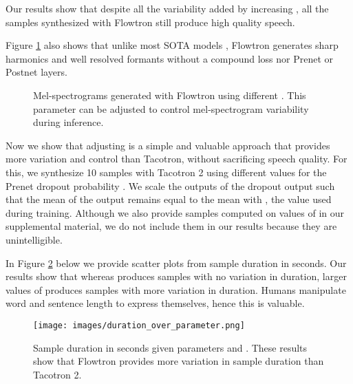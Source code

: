 \documentclass{article}
\begin{document}
Our results show that despite all the variability added by increasing , all the samples synthesized with Flowtron still produce high quality speech.

Figure \ref{fig:mel_quality} also shows that unlike most SOTA models \cite{shen2017natural,arik2017deep,arik2017deep2,ping2017deep,skerry2018towards, wang2018style,binkowski2019high}, Flowtron generates sharp harmonics and well resolved formants without a compound loss nor Prenet or Postnet layers.

\begin{figure}[!ht]
    \centering
    
    
    \caption{Mel-spectrograms generated with Flowtron using different . This parameter can be adjusted to control mel-spectrogram variability during inference.}
    \label{fig:mel_quality}
\end{figure}

Now we show that adjusting  is a simple and valuable approach that provides more variation and control than Tacotron, without sacrificing speech quality. For this, we synthesize 10 samples with Tacotron 2 using different values for the Prenet dropout probability . We scale the outputs of the dropout output such that the mean of the output remains equal to the mean with , the value used during training. Although we also provide samples computed on values of  in our supplemental material, we do not include them in our results because they are unintelligible.

In Figure \ref{fig:sentence_durations} below we provide scatter plots from sample duration in seconds. Our results show that whereas   produces samples with no variation in duration, larger values of  produces samples with more variation in duration. Humans manipulate word and sentence length to express themselves, hence this is valuable.

\begin{figure}[!ht]
    \centering
    \texttt{[image: images/duration\_over\_parameter.png]}
    \caption{Sample duration in seconds given parameters  and . These results show that Flowtron provides more variation in sample duration than Tacotron 2.}
    \label{fig:sentence_durations}
\end{figure}
\end{document}
